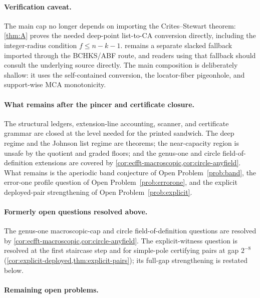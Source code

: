 \documentclass[11pt]{article}
\theoremstyle{definition}
\theoremstyle{remark}
\begin{document}
\paragraph{Verification caveat.}
The main cap no longer depends on importing the Crites--Stewart theorem: \cref{thm:A} proves the needed deep-point list-to-CA conversion directly, including the integer-radius condition $f\le n-k-1$.   remains a separate slacked fallback imported through the BCHKS/ABF route, and readers using that fallback should consult the underlying source directly.  The main composition is deliberately shallow: it uses the self-contained conversion, the locator-fiber pigeonhole, and support-wise MCA monotonicity.

\paragraph{What remains after the pincer and certificate closure.}
The structural ledgers, extension-line accounting, scanner, and certificate grammar are closed at the level needed for the printed sandwich.  The deep regime and the Johnson list regime are theorems; the near-capacity region is unsafe by the quotient and graded floors; and the genus-one and circle field-of-definition extensions are covered by \cref{cor:ecfft-macroscopic,cor:circle-anyfield}.  What remains is the aperiodic band conjecture of Open Problem~\ref{prob:band}, the error-one profile question of Open Problem~\ref{prob:errorone}, and the explicit deployed-pair strengthening of Open Problem~\ref{prob:explicit}.

\paragraph{Formerly open questions resolved above.}
The genus-one macroscopic-cap and circle field-of-definition questions are resolved by \cref{cor:ecfft-macroscopic,cor:circle-anyfield}.  The explicit-witness question is resolved at the first staircase step and for simple-pole certifying pairs at gap $2^{-8}$ \textup(\cref{cor:explicit-deployed,thm:explicit-pairs}\textup); its full-gap strengthening is restated below.

\paragraph{Remaining open problems.}
\end{document}
